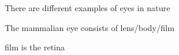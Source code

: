 

There are different examples of eyes in nature

The mammalian eye consists of lens/body/film

film is the retina


